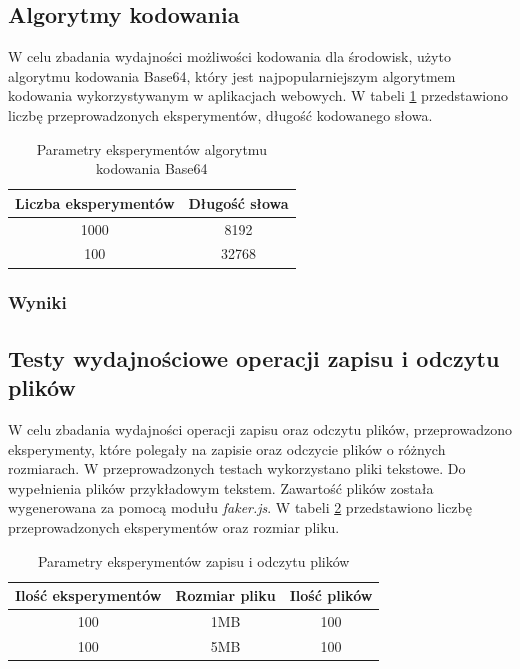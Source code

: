 \subsection{Algorytmy kodowania}
W celu zbadania wydajności możliwości kodowania dla środowisk, użyto algorytmu kodowania Base64, który jest najpopularniejszym algorytmem kodowania wykorzystywanym w aplikacjach webowych. W tabeli \ref{tab:encoding_experiments} przedstawiono liczbę przeprowadzonych eksperymentów, długość kodowanego słowa.

\begin{table}[H]
  \centering
  \caption{Parametry eksperymentów algorytmu kodowania Base64}
  \begin{tabular}{|c|c|}
    \hline
    \textbf{Liczba eksperymentów} & \textbf{Długość słowa}\\ \hline
    1000 & 8192 \\ \hline
    100 & 32768 \\ \hline
  \end{tabular}
  \label{tab:encoding_experiments}
\end{table}

\subsubsection{Wyniki}

\subsection{Testy wydajnościowe operacji zapisu i odczytu plików}
W celu zbadania wydajności operacji zapisu oraz odczytu plików, przeprowadzono eksperymenty, które polegały na zapisie oraz odczycie plików o różnych rozmiarach. W przeprowadzonych testach wykorzystano pliki tekstowe. Do wypełnienia plików przykładowym tekstem. Zawartość plików została wygenerowana za pomocą modułu \textit{faker.js}. W tabeli \ref{tab:file_experiments} przedstawiono liczbę przeprowadzonych eksperymentów oraz rozmiar pliku.

\begin{table}[H]
  \centering
  \caption{Parametry eksperymentów zapisu i odczytu plików}
  \begin{tabular}{|c|c|c|}
    \hline
    \textbf{Ilość eksperymentów} & \textbf{Rozmiar pliku} & \textbf{Ilość plików} \\ \hline
    100 & 1MB & 100 \\ \hline
    100 & 5MB & 100 \\ \hline
  \end{tabular}
  \label{tab:file_experiments}
\end{table}

